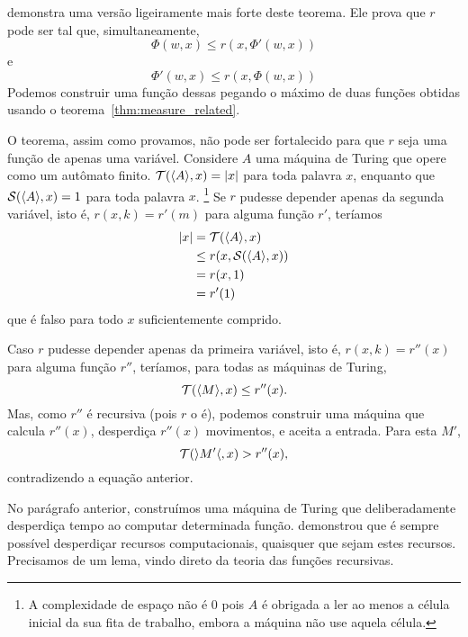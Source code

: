  demonstra uma versão ligeiramente mais forte
deste teorema.
Ele prova que $r$ pode ser tal que,
simultaneamente,
\begin{equation*}
    \Phi(w, x) \leq r( x, \Phi'(w, x))
\end{equation*}
e
\begin{equation*}
    \Phi'(w, x) \leq r( x, \Phi(w, x))
\end{equation*}
Podemos construir uma função dessas
pegando o máximo de duas funções obtidas
usando o teorema~\ref{thm:measure_related}.

O teorema,
assim como provamos,
não pode ser fortalecido
para que $r$ seja uma função de apenas uma variável.
Considere $A$ uma máquina de Turing
que opere como um autômato finito.
${\mathcal{T}}(\langle A \rangle, x) = |x|$ para toda palavra $x$,
enquanto que ${\mathcal{S}}(\langle A \rangle, x) = 1$ para toda palavra $x$.%
\footnote{
    A complexidade de espaço não é $0$
    pois $A$ é obrigada a ler
    ao menos a célula inicial da sua fita de trabalho,
    embora a máquina não use aquela célula.
}
Se $r$ pudesse depender apenas da segunda variável,
isto é, $r(x, k) = r'(m)$ para alguma função $r'$,
teríamos
\begin{align*}
    |x| &= {\mathcal{T}}(\langle A \rangle, x) \\
        &\leq r(x, {\mathcal{S}}(\langle A \rangle, x)) \\
        &= r(x, 1) \\
        &= r'(1)
\end{align*}
que é falso para todo $x$ suficientemente comprido.

Caso $r$ pudesse depender apenas da primeira variável,
isto é, $r(x, k) = r''(x)$ para alguma função $r''$,
teríamos, para todas as máquinas de Turing,
\begin{equation*}
    {\mathcal{T}}(\langle M \rangle, x) \leq r''(x).
\end{equation*}
Mas, como $r''$ é recursiva
(pois $r$ o é),
podemos construir uma máquina que calcula $r''(x)$,
desperdiça $r''(x)$ movimentos,
e aceita a entrada.
Para esta $M'$,
\begin{equation*}
    {\mathcal{T}}(\rangle M' \langle, x) > r''(x),
\end{equation*}
contradizendo a equação anterior.

No parágrafo anterior,
construímos uma máquina de Turing
que deliberadamente desperdiça tempo
ao computar determinada função.
 demonstrou que
é sempre possível desperdiçar recursos computacionais,
quaisquer que sejam estes recursos.
Precisamos de um lema,
vindo direto da teoria das funções recursivas.

